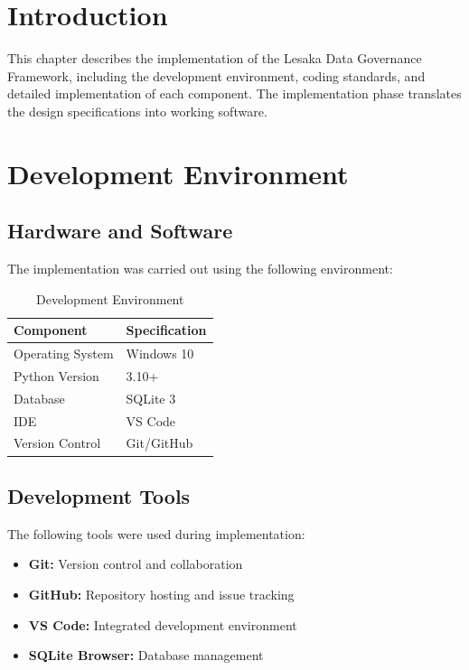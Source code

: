 
\section{Introduction}

This chapter describes the implementation of the Lesaka Data Governance Framework, including the development environment, coding standards, and detailed implementation of each component. The implementation phase translates the design specifications into working software.

\section{Development Environment}

\subsection{Hardware and Software}

The implementation was carried out using the following environment:

\begin{table}[H]
\centering
\begin{tabular}{|l|l|}
\hline
\textbf{Component} & \textbf{Specification} \\
\hline
Operating System & Windows 10 \\
Python Version & 3.10+ \\
Database & SQLite 3 \\
IDE & VS Code \\
Version Control & Git/GitHub \\
\end{tabular}
\caption{Development Environment}
\end{table}

\subsection{Development Tools}

The following tools were used during implementation:

\begin{itemize}
    \item \textbf{Git:} Version control and collaboration
    \item \textbf{GitHub:} Repository hosting and issue tracking
    \item \textbf{VS Code:} Integrated development environment
    \item \textbf{SQLite Browser:} Database management
\end{itemize}

